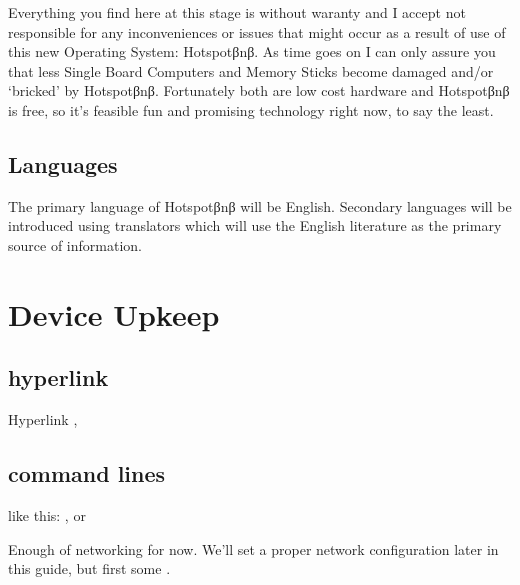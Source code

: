 \documentclass[letterpaper,10pt,openany,oneside,english]{sphinxmanual}
\begin{document}
\sphinxAtStartPar
Everything you find here at this stage is without waranty and I accept not responsible for any inconveniences or issues that might occur as a result of use of this new Operating System: Hotspotβnβ. As time goes on I can only assure you that less Single Board Computers and Memory Sticks become damaged and/or ‘bricked’ by Hotspotβnβ. Fortunately both are low cost hardware and Hotspotβnβ is free, so it’s feasible fun and promising technology right now, to say the least.


\section{Languages}
\label{\detokenize{end-user:languages}}
\sphinxAtStartPar
The primary language of Hotspotβnβ will be English. Secondary languages will be introduced using translators which will use the English literature as the primary source of information.


\chapter{Device Upkeep}
\label{\detokenize{productmaint:device-upkeep}}\label{\detokenize{productmaint::doc}}

\section{hyperlink}
\label{\detokenize{productmaint:hyperlink}}
\sphinxAtStartPar
Hyperlink ,


\section{command lines}
\label{\detokenize{productmaint:command-lines}}
\sphinxAtStartPar
like this: ,  or

\sphinxAtStartPar
Enough of networking for now. We’ll set a proper network configuration later in this guide, but first some .
\end{document}
